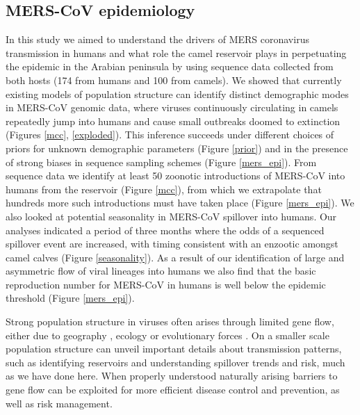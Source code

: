 \documentclass[11pt,oneside,letterpaper]{article}
\def\lmc#1{\textcolor{green}{[#1]}}
\begin{document}
\subsection*{MERS-CoV epidemiology}
In this study we aimed to understand the drivers of MERS coronavirus transmission in humans and what role the camel reservoir plays in perpetuating the epidemic in the Arabian peninsula by using sequence data collected from both hosts (174 from humans and 100 from camels).
We showed that currently existing models of population structure \citep{vaughan_efficient_2014} can identify distinct demographic modes in MERS-CoV genomic data, where viruses continuously circulating in camels repeatedly jump into humans and cause small outbreaks doomed to extinction (Figures \ref{mcc}, \ref{exploded}).
This inference succeeds under different choices of priors for unknown demographic parameters (Figure \ref{prior}) and in the presence of strong biases in sequence sampling schemes (Figure \ref{mers_epi}).
From sequence data we identify at least 50 zoonotic introductions of MERS-CoV into humans from the reservoir (Figure \ref{mcc}), from which we extrapolate that hundreds more such introductions must have taken place (Figure \ref{mers_epi}).
We also looked at potential seasonality in MERS-CoV spillover into humans.
Our analyses indicated a period of three months where the odds of a sequenced spillover event are increased, with timing consistent with an enzootic amongst camel calves (Figure \ref{seasonality}).
As a result of our identification of large and asymmetric flow of viral lineages into humans we also find that the basic reproduction number for MERS-CoV in humans is well below the epidemic threshold (Figure \ref{mers_epi}).

Strong population structure in viruses often arises through limited gene flow, either due to geography \citep{dudas_virus_2017}, ecology \citep{smith_dating_2009} or evolutionary forces \citep{turner_genomic_2005,dudas_reassortment_2015}.
On a smaller scale population structure can unveil important details about transmission patterns, such as identifying reservoirs and understanding spillover trends and risk, much as we have done here.
When properly understood naturally arising barriers to gene flow can be exploited for more efficient disease control and prevention, as well as risk management.
\end{document}
